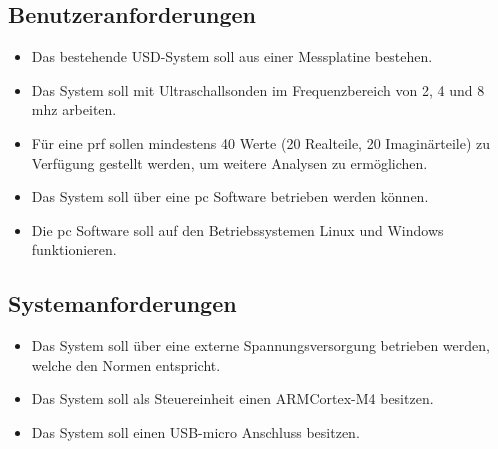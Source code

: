 \subsection*{Benutzeranforderungen}\label{sec:userreq}
\begin{itemize}\itemsep0pt
\item Das bestehende USD-System soll aus einer Messplatine bestehen.
\item Das System soll mit Ultraschallsonden im Frequenzbereich von 2, 4 und 8 \ac{mhz} arbeiten.
\item Für eine \ac{prf} sollen mindestens 40 Werte (20 Realteile, 20 Imaginärteile) zu Verfügung gestellt werden, um weitere Analysen zu ermöglichen.
\item Das System soll über eine \ac{pc} Software betrieben werden können.
\item Die \ac{pc} Software soll auf den Betriebssystemen Linux und Windows funktionieren.
\end{itemize}
\subsection*{Systemanforderungen}\label{sec:sysreq}
\begin{itemize}\itemsep0pt
\item Das System soll über eine externe Spannungsversorgung betrieben werden, welche den Normen entspricht.
\item Das System soll als Steuereinheit einen ARM\SymbReg Cortex\SymbReg-M4 besitzen.
\item Das System soll einen USB-micro Anschluss besitzen.
\end{itemize}
